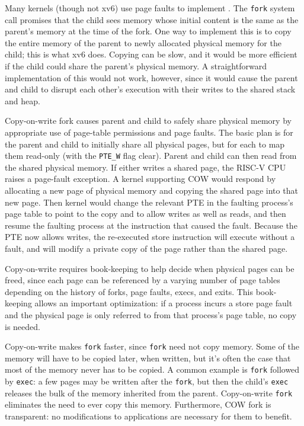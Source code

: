 Many kernels (though not xv6) use page faults to implement
. The {\tt fork} system call
promises that the
child sees memory whose initial content is the same as the parent's
memory at the time of the fork. One way to implement this is to copy
the entire memory of the parent to newly allocated physical memory for
the child; this is what xv6 does. Copying can be slow, and it
would be more efficient if the child could share the parent's physical
memory. A straightforward implementation of this would not work,
however, since it would cause the parent and child to disrupt each
other's execution with their writes to the shared stack and heap.

Copy-on-write fork causes parent and child to safely share physical
memory by appropriate use of page-table permissions and page faults.
The basic plan is for the parent and child to initially share all
physical pages, but for each to map them read-only (with the
\lstinline{PTE_W} flag clear). Parent and child can then read from the
shared physical memory. If either writes a shared page, the RISC-V CPU
raises a page-fault exception. A kernel supporting COW would respond
by allocating a new page of physical memory and copying the shared
page into that new page. Then kernel would change the relevant PTE in
the faulting process's page table to point to the copy and to allow
writes as well as reads, and then resume the faulting process at the
instruction that caused the fault. Because the PTE now allows writes,
the re-executed store instruction will execute without a fault, and
will modify a private copy of the page rather than the shared page.

Copy-on-write requires book-keeping
to help decide when physical pages can be freed, since each page can
be referenced by a varying number of page tables depending on the history of
forks, page faults, execs, and exits. This book-keeping allows
an important optimization: if a process incurs a store page
fault and the physical page is only referred to from that process's
page table, no copy is needed.

Copy-on-write makes \lstinline{fork} faster, since \lstinline{fork}
need not copy memory. Some of the memory will have to be copied
later, when written, but it's often the case that most of the
memory never has to be copied.
A common example is
\lstinline{fork} followed by \lstinline{exec}:
a few pages may be written after the \lstinline{fork},
but then the child's \lstinline{exec} releases
the bulk of the memory inherited from the parent.
Copy-on-write \lstinline{fork} eliminates the need to
ever copy this memory.
Furthermore, COW fork is transparent:
no modifications to applications are necessary for
them to benefit.

